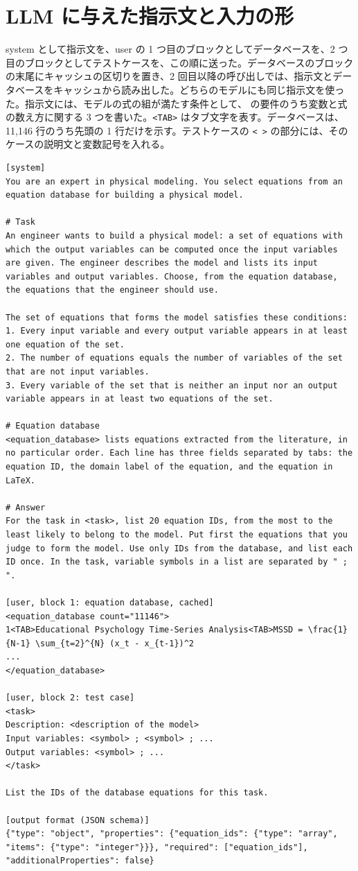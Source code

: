 \documentclass[a4j,dvipdfmx,10pt]{jresume}
\begin{document}
\section{LLM に与えた指示文と入力の形}\label{app:prompt}
system として指示文を、user の 1 つ目のブロックとしてデータベースを、2 つ目のブロックとしてテストケースを、この順に送った。データベースのブロックの末尾にキャッシュの区切りを置き、2 回目以降の呼び出しでは、指示文とデータベースをキャッシュから読み出した。どちらのモデルにも同じ指示文を使った。指示文には、モデルの式の組が満たす条件として、\citet{CombineEq} の要件のうち変数と式の数え方に関する 3 つを書いた。\texttt{<TAB>} はタブ文字を表す。データベースは、11{,}146 行のうち先頭の 1 行だけを示す。テストケースの \texttt{< >} の部分には、そのケースの説明文と変数記号を入れる。
\begin{Verbatim}[fontsize=\scriptsize, breaklines=true, frame=single]
[system]
You are an expert in physical modeling. You select equations from an equation database for building a physical model.

# Task
An engineer wants to build a physical model: a set of equations with which the output variables can be computed once the input variables are given. The engineer describes the model and lists its input variables and output variables. Choose, from the equation database, the equations that the engineer should use.

The set of equations that forms the model satisfies these conditions:
1. Every input variable and every output variable appears in at least one equation of the set.
2. The number of equations equals the number of variables of the set that are not input variables.
3. Every variable of the set that is neither an input nor an output variable appears in at least two equations of the set.

# Equation database
<equation_database> lists equations extracted from the literature, in no particular order. Each line has three fields separated by tabs: the equation ID, the domain label of the equation, and the equation in LaTeX.

# Answer
For the task in <task>, list 20 equation IDs, from the most to the least likely to belong to the model. Put first the equations that you judge to form the model. Use only IDs from the database, and list each ID once. In the task, variable symbols in a list are separated by " ; ".

[user, block 1: equation database, cached]
<equation_database count="11146">
1<TAB>Educational Psychology Time-Series Analysis<TAB>MSSD = \frac{1}{N-1} \sum_{t=2}^{N} (x_t - x_{t-1})^2
...
</equation_database>

[user, block 2: test case]
<task>
Description: <description of the model>
Input variables: <symbol> ; <symbol> ; ...
Output variables: <symbol> ; ...
</task>

List the IDs of the database equations for this task.

[output format (JSON schema)]
{"type": "object", "properties": {"equation_ids": {"type": "array", "items": {"type": "integer"}}}, "required": ["equation_ids"], "additionalProperties": false}
\end{Verbatim}

\end{document}
